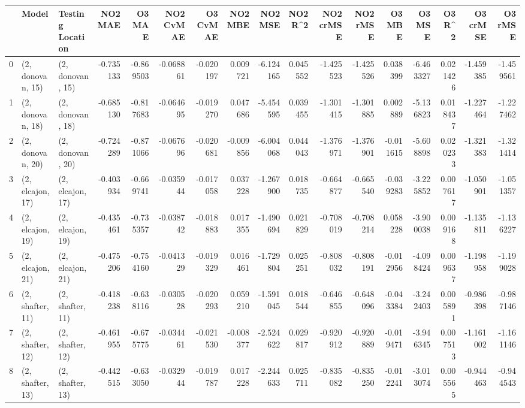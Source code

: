 \begin{tabular}{lllrrrrrrrrrrrrrr}
\toprule
{} &             Model &  Testing Location &   NO2 MAE &    O3 MAE &  NO2 CvMAE &  O3 CvMAE &   NO2 MBE &    NO2 MSE &   NO2 R\textasciicircum2 &  NO2 crMSE &  NO2 rMSE &    O3 MBE &     O3 MSE &    O3 R\textasciicircum2 &  O3 crMSE &   O3 rMSE \\
\midrule
0  &  (2, donovan, 15) &  (2, donovan, 15) & -0.735133 & -0.869503 &  -0.068861 & -0.020197 &  0.009721 &  -6.124165 &  0.045552 &  -1.425523 & -1.425526 &  0.038399 &  -6.463327 &  0.021426 & -1.459385 & -1.459561 \\
1  &  (2, donovan, 18) &  (2, donovan, 18) & -0.685130 & -0.817683 &  -0.064695 & -0.019270 &  0.047686 &  -5.454595 &  0.039455 &  -1.301415 & -1.301885 &  0.002889 &  -5.136823 &  0.018437 & -1.227464 & -1.227462 \\
2  &  (2, donovan, 20) &  (2, donovan, 20) & -0.724289 & -0.871066 &  -0.067696 & -0.020681 & -0.009856 &  -6.004068 &  0.044043 &  -1.376971 & -1.376901 & -0.011615 &  -5.608898 &  0.020233 & -1.321383 & -1.321414 \\
3  &  (2, elcajon, 17) &  (2, elcajon, 17) & -0.403934 & -0.669741 &  -0.035944 & -0.017058 &  0.037228 &  -1.267900 &  0.018735 &  -0.664877 & -0.665540 & -0.039283 &  -3.225852 &  0.007617 & -1.050901 & -1.051357 \\
4  &  (2, elcajon, 19) &  (2, elcajon, 19) & -0.435461 & -0.735357 &  -0.038742 & -0.018883 &  0.017355 &  -1.490694 &  0.021829 &  -0.708019 & -0.708214 &  0.058228 &  -3.900038 &  0.009168 & -1.135811 & -1.136227 \\
5  &  (2, elcajon, 21) &  (2, elcajon, 21) & -0.475206 & -0.754160 &  -0.041329 & -0.019329 &  0.016461 &  -1.729804 &  0.025251 &  -0.808032 & -0.808191 & -0.012956 &  -4.098424 &  0.009637 & -1.198958 & -1.199028 \\
6  &  (2, shafter, 11) &  (2, shafter, 11) & -0.418238 & -0.638116 &  -0.030528 & -0.020293 &  0.059210 &  -1.591045 &  0.018544 &  -0.646855 & -0.648096 & -0.043384 &  -3.242403 &  0.005891 & -0.986398 & -0.987146 \\
7  &  (2, shafter, 12) &  (2, shafter, 12) & -0.461955 & -0.675775 &  -0.034461 & -0.021530 & -0.008377 &  -2.524622 &  0.029817 &  -0.920912 & -0.920889 & -0.019471 &  -3.946345 &  0.007513 & -1.161002 & -1.161146 \\
8  &  (2, shafter, 13) &  (2, shafter, 13) & -0.442515 & -0.633050 &  -0.032944 & -0.019787 &  0.017228 &  -2.244633 &  0.025711 &  -0.835082 & -0.835250 & -0.012241 &  -3.013074 &  0.005565 & -0.944463 & -0.944543 \\

\end{tabular}
